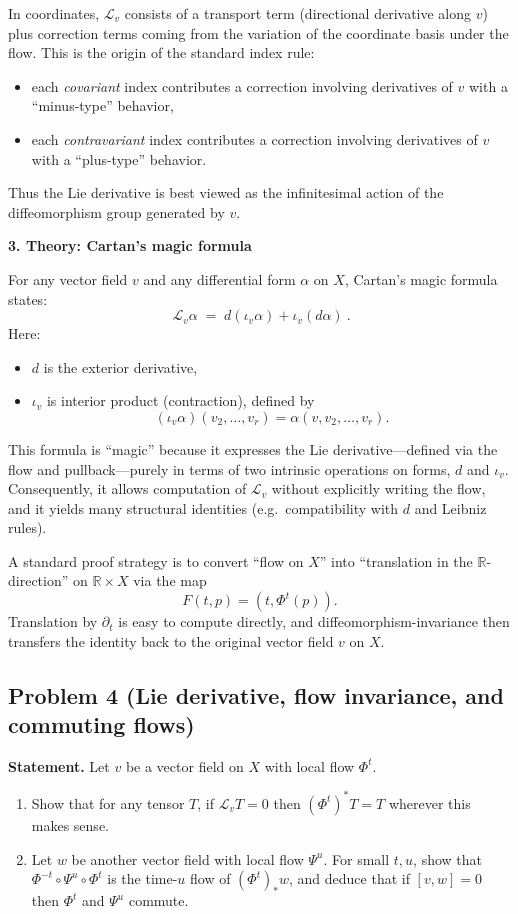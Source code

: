 \documentclass[12pt,a4paper]{article}
\theoremstyle{plain}
\theoremstyle{definition}      %
\begin{document}
In coordinates, $\mathcal{L}_v$ consists of a transport term (directional derivative along $v$) plus correction terms coming from the variation of the coordinate basis under the flow. This is the origin of the standard index rule:
\begin{itemize}
	\item each \emph{covariant} index contributes a correction involving derivatives of $v$ with a ``minus-type'' behavior,
	\item each \emph{contravariant} index contributes a correction involving derivatives of $v$ with a ``plus-type'' behavior.
\end{itemize}
Thus the Lie derivative is best viewed as the infinitesimal action of the diffeomorphism group generated by $v$.

\bigskip
\textbf{3. Theory: Cartan's magic formula}

For any vector field $v$ and any differential form $\alpha$ on $X$, Cartan's magic formula states:
\[
\boxed{\ \mathcal{L}_v\alpha \;=\; d(\iota_v\alpha)+\iota_v(d\alpha)\ }.
\]
Here:
\begin{itemize}
	\item $d$ is the exterior derivative,
	\item $\iota_v$ is interior product (contraction), defined by
	\[
	(\iota_v\alpha)(v_2,\dots,v_r)=\alpha(v,v_2,\dots,v_r).
	\]
\end{itemize}
This formula is ``magic'' because it expresses the Lie derivative---defined via the flow and pullback---purely in terms of two intrinsic operations on forms, $d$ and $\iota_v$. Consequently, it allows computation of $\mathcal{L}_v$ without explicitly writing the flow, and it yields many structural identities (e.g.\ compatibility with $d$ and Leibniz rules).

A standard proof strategy is to convert ``flow on $X$'' into ``translation in the $\mathbb{R}$-direction'' on $\mathbb{R}\times X$ via the map
\[
F(t,p)=(t,\Phi^t(p)).
\]
Translation by $\partial_t$ is easy to compute directly, and diffeomorphism-invariance then transfers the identity back to the original vector field $v$ on $X$.

\subsection*{Problem 4 (Lie derivative, flow invariance, and commuting flows)}
\textbf{Statement.}
Let $v$ be a vector field on $X$ with local flow $\Phi^t$.
\begin{enumerate}
	\item[(a)] Show that for any tensor $T$, if $\mathcal L_v T=0$ then $(\Phi^t)^*T=T$ wherever this makes sense.
	\item[(b)] Let $w$ be another vector field with local flow $\Psi^u$.
	For small $t,u$, show that $\Phi^{-t}\circ \Psi^u\circ \Phi^t$ is the time-$u$ flow of $(\Phi^t)_*w$,
	and deduce that if $[v,w]=0$ then $\Phi^t$ and $\Psi^u$ commute.
\end{enumerate}
\end{document}
